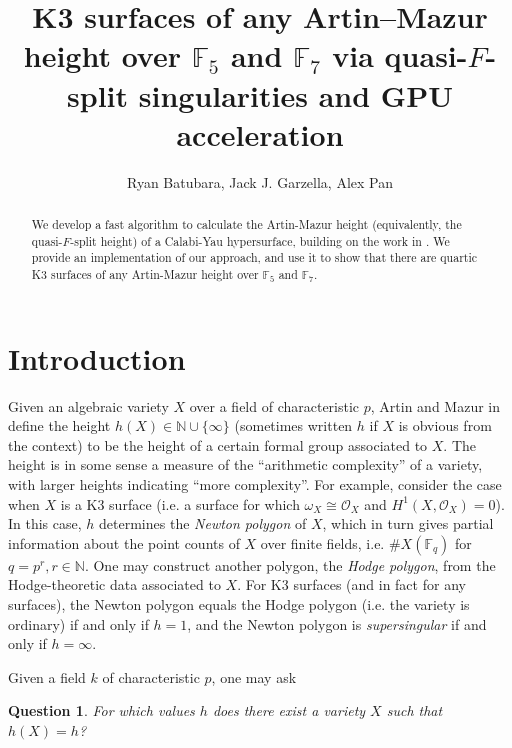 \documentclass[a4paper]{article}
\title{K3 surfaces of any Artin--Mazur height over \(\mathbb{F}_{5}\) and 
    \(\mathbb{F}_{7}\) via 
quasi-\(F\)-split singularities and GPU acceleration}
\author{Ryan Batubara, Jack J. Garzella, Alex Pan}
\newtheorem{quest}[thm]{Question}
\theoremstyle{definition}
\theoremstyle{remark}
\newcommand{\isom}{\cong}
\begin{document}
\maketitle

\begin{abstract}
    \noindent We develop a fast algorithm to calculate the Artin-Mazur height (equivalently, the
    quasi-\(F\)-split height) of a Calabi-Yau hypersurface, building on the work in
    \cite{kty-2022-fedder}. 
    We provide an implementation of our approach, and use it to show that there are quartic
    K3 surfaces of any Artin-Mazur height over \(\mathbb{F}_{5}\) and \(\mathbb{F}_7\).
\end{abstract}


\section{Introduction}

Given an algebraic variety \(X\) over a field of characteristic \(p\),
Artin and Mazur in \cite{artin-mazur-1977-height}
define the height \(h(X) \in \mathbb{N} \cup \{\infty\}\) 
(sometimes written \(h\) if \(X\) is obvious from the context)
to be the height 
of a certain formal group associated to \(X\).
The height is in some sense a measure of the
``arithmetic complexity'' of a variety,
with larger heights indicating ``more complexity''.
For example, consider the case when \(X\) is a 
K3 surface (i.e. a surface for which \(\omega_{X} \isom \mathcal{O}_{X} \) 
and \(H^{1}(X,\mathcal{O}_{X} ) = 0\)).
In this case, \(h\) determines the \textit{Newton polygon}
of \(X\), which in turn gives partial information about the 
point counts of \(X\) over finite fields,
i.e. \(\#X(\mathbb{F}_{q})\) for \(q = p^{r}, r \in \mathbb{N}\).
One may construct another polygon, the \textit{Hodge polygon},
from the Hodge-theoretic data associated to \(X\).
For K3 surfaces (and in fact for any surfaces), 
the Newton polygon equals the Hodge polygon
(i.e. the variety is ordinary) if and only if \(h=1\),
and the Newton polygon is \textit{supersingular} if and only if 
\(h = \infty\).

Given a field \(k\) of characteristic \(p\), one may ask

\begin{quest}
    For which values \(h\) does there exist a variety
    \(X\) such that \(h(X) = h\)?
\end{quest}
\end{document}
